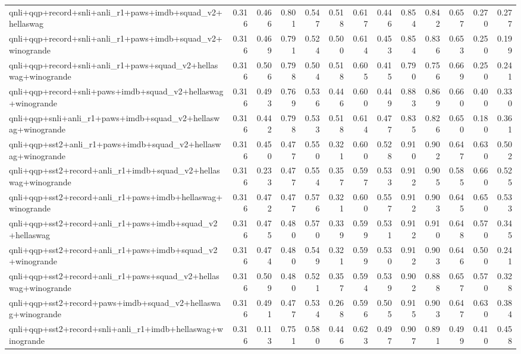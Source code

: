 \begin{table}[t]
\begin{tabular}{lrrrrrrrrrrrr}
    qnli+qqp+record+snli+anli\_r1+paws+imdb+squad\_v2+hellaswag & 0.316 & 0.466 & 0.801 & 0.547 & 0.518 & 0.617 & 0.446 & 0.854 & 0.842 & 0.657 & 0.270 & 0.277 \\
    qnli+qqp+record+snli+anli\_r1+paws+imdb+squad\_v2+winogrande & 0.316 & 0.469 & 0.791 & 0.524 & 0.500 & 0.614 & 0.453 & 0.854 & 0.836 & 0.653 & 0.250 & 0.199 \\
    qnli+qqp+record+snli+anli\_r1+paws+squad\_v2+hellaswag+winogrande & 0.316 & 0.506 & 0.798 & 0.504 & 0.518 & 0.605 & 0.415 & 0.790 & 0.756 & 0.669 & 0.250 & 0.241 \\
    qnli+qqp+record+snli+paws+imdb+squad\_v2+hellaswag+winogrande & 0.316 & 0.493 & 0.769 & 0.536 & 0.446 & 0.600 & 0.449 & 0.883 & 0.869 & 0.660 & 0.400 & 0.330 \\
    qnli+qqp+snli+anli\_r1+paws+imdb+squad\_v2+hellaswag+winogrande & 0.316 & 0.442 & 0.798 & 0.533 & 0.518 & 0.614 & 0.477 & 0.835 & 0.826 & 0.650 & 0.180 & 0.361 \\
    qnli+qqp+sst2+anli\_r1+paws+imdb+squad\_v2+hellaswag+winogrande & 0.316 & 0.450 & 0.477 & 0.550 & 0.321 & 0.600 & 0.528 & 0.910 & 0.902 & 0.647 & 0.630 & 0.502 \\
    qnli+qqp+sst2+record+anli\_r1+imdb+squad\_v2+hellaswag+winogrande & 0.316 & 0.233 & 0.477 & 0.554 & 0.357 & 0.597 & 0.533 & 0.912 & 0.905 & 0.585 & 0.660 & 0.525 \\
    qnli+qqp+sst2+record+anli\_r1+paws+imdb+hellaswag+winogrande & 0.316 & 0.472 & 0.477 & 0.576 & 0.321 & 0.600 & 0.557 & 0.912 & 0.903 & 0.645 & 0.650 & 0.533 \\
    qnli+qqp+sst2+record+anli\_r1+paws+imdb+squad\_v2+hellaswag & 0.316 & 0.475 & 0.480 & 0.570 & 0.339 & 0.599 & 0.531 & 0.912 & 0.910 & 0.648 & 0.570 & 0.345 \\
    qnli+qqp+sst2+record+anli\_r1+paws+imdb+squad\_v2+winogrande & 0.316 & 0.474 & 0.480 & 0.549 & 0.321 & 0.599 & 0.530 & 0.912 & 0.903 & 0.646 & 0.500 & 0.241 \\
    qnli+qqp+sst2+record+anli\_r1+paws+squad\_v2+hellaswag+winogrande & 0.316 & 0.509 & 0.480 & 0.521 & 0.357 & 0.594 & 0.539 & 0.902 & 0.888 & 0.657 & 0.570 & 0.328 \\
    qnli+qqp+sst2+record+paws+imdb+squad\_v2+hellaswag+winogrande & 0.316 & 0.491 & 0.477 & 0.534 & 0.268 & 0.596 & 0.505 & 0.915 & 0.903 & 0.647 & 0.630 & 0.384 \\
    qnli+qqp+sst2+record+snli+anli\_r1+imdb+hellaswag+winogrande & 0.316 & 0.113 & 0.751 & 0.580 & 0.446 & 0.623 & 0.497 & 0.907 & 0.891 & 0.499 & 0.410 & 0.458 \\

\end{tabular}
\end{table}
